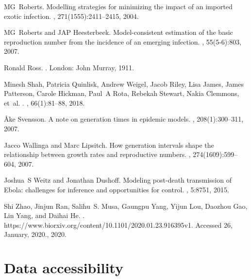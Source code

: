 \documentclass[12pt]{article}
\begin{document}
\begin{thebibliography}{10}
MG~Roberts.
\newblock Modelling strategies for minimizing the impact of an imported exotic
  infection.
, 271(1555):2411--2415, 2004.

MG~Roberts and JAP Heesterbeek.
\newblock Model-consistent estimation of the basic reproduction number from the
  incidence of an emerging infection.
, 55(5-6):803, 2007.

Ronald Ross.
.
\newblock London: John Murray, 1911.

Minesh Shah, Patricia Quinlisk, Andrew Weigel, Jacob Riley, Lisa James, James
  Patterson, Carole Hickman, Paul~A Rota, Rebekah Stewart, Nakia Clemmons,
  et~al.
.
, 66(1):81--88, 2018.

{\AA}ke Svensson.
\newblock A note on generation times in epidemic models.
, 208(1):300--311, 2007.

Jacco Wallinga and Marc Lipsitch.
\newblock How generation intervals shape the relationship between growth rates
  and reproductive numbers.
, 274(1609):599--604, 2007.

Joshua~S Weitz and Jonathan Dushoff.
\newblock Modeling post-death transmission of {Ebola}: challenges for inference
  and opportunities for control.
, 5:8751, 2015.

Shi Zhao, Jinjun Ran, Salihu~S. Musa, Gaungpu Yang, Yijun Lou, Daozhou Gao, Lin
  Yang, and Daihai He.
.
\newblock https://www.biorxiv.org/content/10.1101/2020.01.23.916395v1. Accessed
  26, January, 2020., 2020.

\end{thebibliography}

\section*{Data accessibility}
\end{document}
